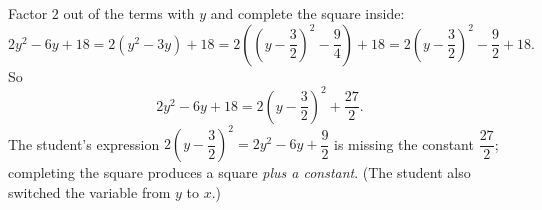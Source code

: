 Factor $2$ out of the terms with $y$ and complete the square inside:
\[
2y^2-6y+18=2\left(y^2-3y\right)+18=2\left(\left(y-\dfrac{3}{2}\right)^2-\dfrac{9}{4}\right)+18 =2\left(y-\dfrac{3}{2}\right)^2-\dfrac{9}{2}+18 .
\]
So
\[
2y^2-6y+18=\boxed{2\left(y-\dfrac{3}{2}\right)^2+\dfrac{27}{2}}.
\]
The student's expression $2\left(y-\dfrac{3}{2}\right)^2=2y^2-6y+\dfrac{9}{2}$ is missing the constant $\dfrac{27}{2}$; completing the square produces a square \emph{plus a constant}. (The student also switched the variable from $y$ to $x$.)

